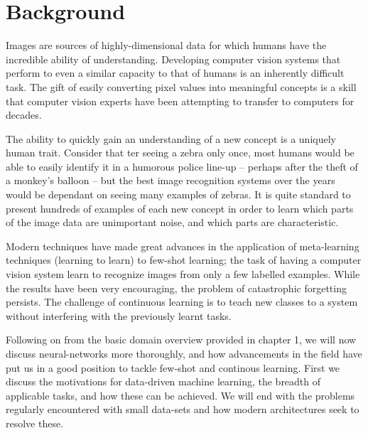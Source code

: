 \documentclass{report}
\begin{document}
	\chapter{Background} \label{background:1}
	Images are sources of highly-dimensional data for which humans have the incredible ability of understanding. Developing computer vision systems that perform to even a similar capacity to that of humans is an inherently difficult task. The gift of easily converting pixel values into meaningful concepts is a skill that computer vision experts have been attempting to transfer to computers for decades. \par
	The ability to quickly gain an understanding of a new concept is a uniquely human trait. Consider that ter seeing a zebra only once, most humans would be able to easily identify it in a humorous police line-up  -- perhaps after the theft of a monkey's balloon --  but the best image recognition systems over the years would be dependant on seeing many examples of zebras. It is quite standard to present hundreds of examples of each new concept in order to learn which parts of the image data are unimportant noise, and which parts are characteristic. \par
	Modern techniques have made great advances in the application of meta-learning techniques (learning to learn) to few-shot learning; the task of having a computer vision system learn to recognize images from only a few labelled examples. While the results have been very encouraging, the problem of catastrophic forgetting persists. The challenge of continuous learning is to teach new classes to a system without interfering with the previously learnt tasks. \par
	Following on from the basic domain overview provided in chapter 1, we will now discuss neural-networks more thoroughly, and how advancements in the field have put us in a good position to tackle few-shot and continous learning. First we discuss the motivations for data-driven machine learning, the breadth of applicable tasks, and how these can be achieved. We will end with the problems regularly encountered with small data-sets and how modern architectures seek to resolve these. \par
	
\end{document}
